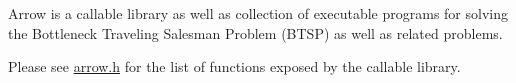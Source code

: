 Arrow is a callable library as well as collection of executable programs for solving the Bottleneck Traveling Salesman Problem (BTSP) as well as related problems.

Please see \hyperlink{arrow_8h}{arrow.h} for the list of functions exposed by the callable library. 